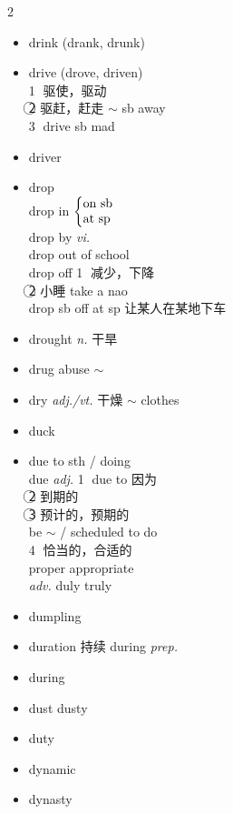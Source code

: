 \documentclass[../../book.tex]{subfiles}
\begin{document}
\begin{multicols}{2}
\begin{itemize}
\\\emph{vt.} \textcircled{1} 钻 $\sim$ a hole \emph{n.} 钻头
\\\textcircled{2} 培训，训练
\item[-] drink (drank, drunk)
\item[-] drive (drove, driven)
\\\textcircled{1} 驱使，驱动
\\\textcircled{2} 驱赶，赶走 $\sim$ sb away
\\\textcircled{3} drive sb mad
\item[-] driver
\item[-] drop
\\drop in $\left\{
\begin{array}{@{}l@{}}
\text{on sb} \\
\text{at sp}
\end{array}
\right.$
\\drop by \emph{vi.}
\\drop out of school
\\drop off \textcircled{1} 减少，下降
\\\textcircled{2} 小睡 take a nao
\\drop sb off at sp 让某人在某地下车
\item[-] drought \emph{n.} 干旱
\item[-] drug \phantom{a} abuse $\sim$
\item[-] dry \emph{adj./vt.} 干燥 $\sim$ clothes
\item[-] duck
\item[-] due to sth / doing
\\due \emph{adj.} \textcircled{1} due to 因为
\\\textcircled{2} 到期的
\\\textcircled{3} 预计的，预期的 \\\phantom{aaa}be $\sim$ / scheduled to do
\\\textcircled{4} 恰当的，合适的 \\\phantom{aaa}proper appropriate
\\\emph{adv.} duly \phantom{a} {\color{violet}truly}
\item[-] dumpling
\item[-] duration 持续 \phantom{a} during \emph{prep.}
\item[-] during
\item[-] dust \phantom{a} dusty
\item[-] duty
\item[-] dynamic
\item[-] dynasty

\end{itemize}
\end{multicols}
\end{document}
